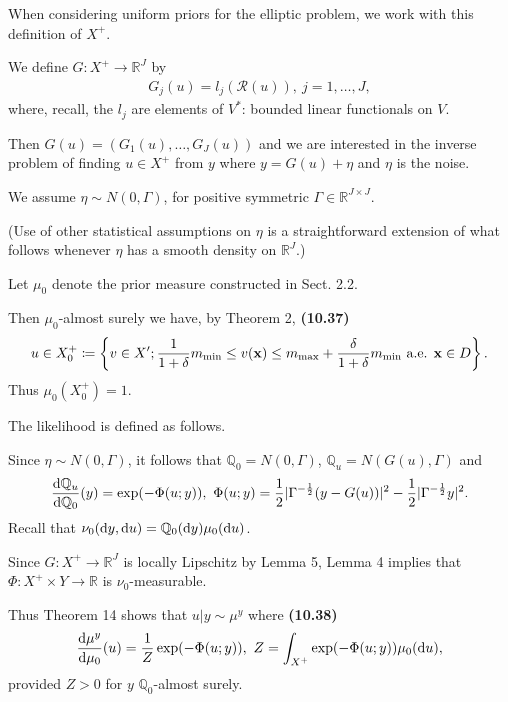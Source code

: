 \documentclass[oneside,11pt]{book}
\numberwithin{equation}{section}
\begin{document}
When considering uniform priors for the elliptic problem, we work with this definition of $X^+$.

%
We define $G:X^+\to\mathbb{R}^J$ by
\begin{align*}
    G_j(u) = l_j(\mathcal{R}(u)),\ j = 1,\ldots,J,
\end{align*}
where, recall, the $l_j$ are elements of $V^*$: bounded linear functionals on $V$.

Then $G(u) = (G_1(u),\ldots,G_J(u))$ and we are interested in the inverse problem of finding $u\in X^+$ from $y$ where $y = G(u) + \eta$ and $\eta$ is the noise.

We assume $\eta\sim N(0,\Gamma)$, for positive symmetric $\Gamma\in\mathbb{R}^{J\times J}$.

(Use of other statistical assumptions on $\eta$ is a straightforward extension of what follows whenever $\eta$ has a smooth density on $\mathbb{R}^J$.)

%
Let $\mu_0$ denote the prior measure constructed in Sect. 2.2.

Then $\mu_0$-almost surely we have, by Theorem 2, \textbf{(10.37)}
\begin{align*}
    u\in X_0^+\coloneqq\left\{v\in X';\frac{1}{1 + \delta}m_{\min}\le v({\bf x})\le m_{\max} + \frac{\delta}{1 + \delta}m_{\min} \mbox{ a.e. } {\bf x}\in D\right\}.
\end{align*}
Thus $\mu_0(X_0^+) = 1$.

%
The likelihood is defined as follows.

Since $\eta\sim N(0,\Gamma)$, it follows that $\mathbb{Q}_0 = N(0,\Gamma)$, $\mathbb{Q}_u = N(G(u),\Gamma)$ and
\begin{align*}
    \frac{{\rm d}\mathbb{Q}_u}{{\rm d}\mathbb{Q}_0}(y) = \exp(-\Phi(u;y)),\ \Phi(u;y) = \frac{1}{2}|\Gamma^{-\frac{1}{2}}(y - G(u))|^2 - \frac{1}{2}|\Gamma^{-\frac{1}{2}}y|^2.
\end{align*}
Recall that $\nu_0({\rm d}y,{\rm d}u) = \mathbb{Q}_0({\rm d}y)\mu_0({\rm d}u)$.

Since $G:X^+\to\mathbb{R}^J$ is locally Lipschitz by Lemma 5, Lemma 4 implies that $\Phi: X^+\times Y\to\mathbb{R}$ is $\nu_0$-measurable.

Thus Theorem 14 shows that $u|y\sim\mu^y$ where \textbf{(10.38)}
\begin{align*}
    \frac{{\rm d}\mu^y}{{\rm d}\mu_0}(u) = \frac{1}{Z}\exp(-\Phi(u;y)),\ Z = \int_{X^+} \exp(-\Phi(u;y))\mu_0({\rm d}u),
\end{align*}
provided $Z > 0$ for $y$ $\mathbb{Q}_0$-almost surely.
\end{document}
